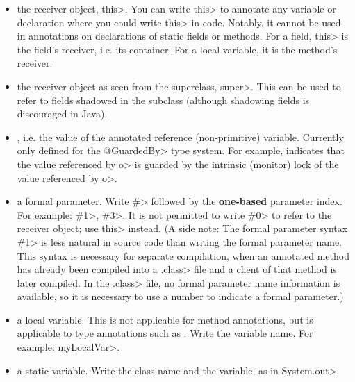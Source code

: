 \begin{itemize}
\item
  the receiver object, \<this>.  You can write \<this> to annotate any
  variable or declaration where you could write \<this> in code.
  Notably, it cannot be used in annotations on declarations of
  static fields or methods.  For a field, \<this> is the field's
  receiver, i.e. its container.  For a local variable, it is the
  method's receiver.

\item
  the receiver object as seen from the superclass, \<super>.  This can be used
  to refer to fields shadowed in the subclass (although shadowing fields is
  discouraged in Java).

\item
  , i.e. the value of the annotated reference (non-primitive) variable.
  Currently only defined for the \<@GuardedBy> type system.
  For example,  indicates that the value
  referenced by \<o> is guarded by the intrinsic (monitor) lock of the value
  referenced by \<o>.

\item
  a formal parameter.  Write \<\#> followed by the \textbf{one-based} parameter
  index.  For example: \<\#1>, \<\#3>.  It is not permitted to write \<\#0> to
  refer to the receiver object; use \<this> instead.  (A side note:
  The formal parameter syntax \<\#1> is less natural in source code
  than writing the formal parameter name.  This syntax is necessary for
  separate compilation, when an annotated method has already been compiled
  into a \<.class> file and a client of that method is later compiled.
  In the \<.class> file, no formal parameter name information is available,
  so it is necessary to use a number to indicate a formal parameter.)

\item
  a local variable.  This is not applicable for method annotations, but is
  applicable to type annotations such as
  .  Write the variable name.  For
  example: \<myLocalVar>.

\item
  a static variable.  Write the class name and the variable, as in
  \<System.out>.


\end{itemize}
